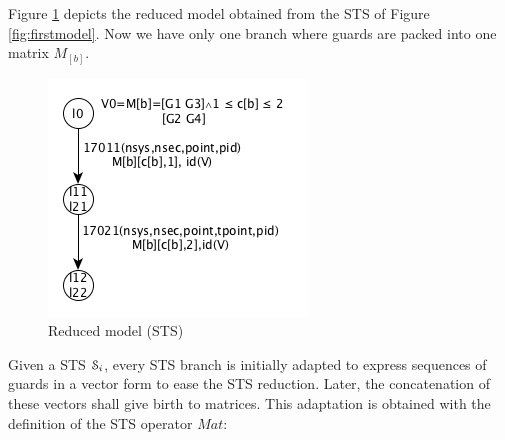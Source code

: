 Figure \ref{fig:reduced-model} depicts the reduced model obtained
from the STS of Figure \ref{fig:firstmodel}. Now we have only one
branch where guards are packed into one matrix $M_{[b]}$.

\begin{figure}[H]
  \includegraphics[width=0.5\linewidth]{figures/STS2.png}

	\caption{Reduced model (STS)}
	\label{fig:reduced-model}
\end{figure}

Given a STS $\EuScript{S}_i$, every STS branch is initially
adapted to express sequences of guards in a vector form to ease
the STS reduction. Later, the concatenation of these vectors
shall give birth to matrices. This adaptation is obtained with
the definition of the STS operator $Mat$:

